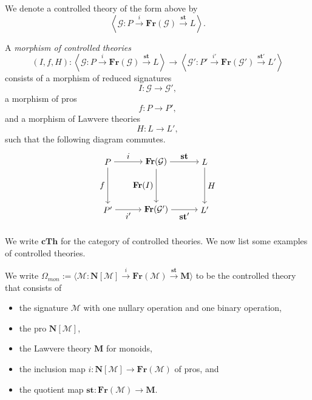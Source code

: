 \documentclass{tac}
\begin{document}
We denote a controlled theory of the form above by
\[
\left\langle
\mathcal{G}:
P\xrightarrow{i}\mathbf{Fr}(\mathcal{G})
\xrightarrow{\mathbf{st}}L
\right\rangle.
\]

\begin{definition}
A \emph{morphism of controlled theories}
\[
(I,f,H):
\left\langle
\mathcal{G}:P\xrightarrow{i}\mathbf{Fr}(\mathcal{G})
\xrightarrow{\mathbf{st}}L
\right\rangle
\longrightarrow
\left\langle
\mathcal{G}':P'\xrightarrow{i'}\mathbf{Fr}(\mathcal{G}')
\xrightarrow{\mathbf{st}'}L'
\right\rangle
\]
consists of a morphism of reduced signatures
\[
I:\mathcal{G}\to\mathcal{G}',
\]
a morphism of pros
\[
f:P\to P',
\]
and a morphism of Lawvere theories
\[
H:L\to L',
\]
such that the following diagram commutes.
\[
\begin{tikzpicture}[node distance=2cm]
\node (A) {$P$};
\node (B) [below of=A] {$P'$};
\node (C) [right of=A] {$\mathbf{Fr}(\mathcal{G})$};
\node (D) [below of=C] {$\mathbf{Fr}(\mathcal{G}')$};
\node (E) [right of=C] {$L$};
\node (F) [below of=E] {$L'$};

\draw[->] (A) -- node[left] {$f$} (B);
\draw[->] (A) -- node[above] {$i$} (C);
\draw[->] (B) -- node[below] {$i'$} (D);
\draw[->] (C) -- node[left] {$\mathbf{Fr}(I)$} (D);
\draw[->] (C) -- node[above] {$\mathbf{st}$} (E);
\draw[->] (D) -- node[below] {$\mathbf{st}'$} (F);
\draw[->] (E) -- node[right] {$H$} (F);
\end{tikzpicture}
\]
\end{definition}

We write $\mathbf{cTh}$ for the category of controlled theories. We now list some examples of controlled theories. 
\begin{example}\label{cont_theory_for_mon_gpds} We write $\Omega_{mon}:=\langle \mathcal{M}:\mathbf{N}[\mathcal{M}]\xrightarrow{i}\mathbf{Fr}(\mathcal{M})\xrightarrow{\mathbf{st}}\mathbf{M}\rangle$ to be the controlled theory that consists of
\begin{itemize}
\item  the signature $\mathcal{M}$ with one nullary operation and one binary operation,
\item the pro $\mathbf{N}[\mathcal{M}]$,
\item the Lawvere theory $\mathbf{M}$ for monoids,
\item the inclusion map $i:\mathbf{N}[\mathcal{M}]\to \mathbf{Fr}(\mathcal{M})$ of pros, and
\item the quotient map $\mathbf{st}:\mathbf{Fr}(\mathcal{M})\to\mathbf{M}$.
\end{itemize}
\end{example}
\end{document}

